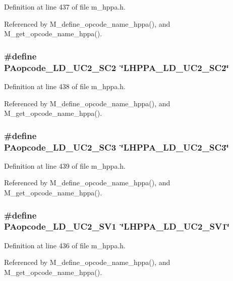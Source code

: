 Definition at line 437 of file m\_\-hppa.h.

Referenced by M\_\-define\_\-opcode\_\-name\_\-hppa(), and M\_\-get\_\-opcode\_\-name\_\-hppa().
\subsubsection{\setlength{\rightskip}{0pt plus 5cm}\#define PAopcode\_\-LD\_\-UC2\_\-SC2~\char`\"{}LHPPA\_\-LD\_\-UC2\_\-SC2\char`\"{}}\label{m__hppa_8h_3603bca4075fafcb8d890057ea895f97}




Definition at line 438 of file m\_\-hppa.h.

Referenced by M\_\-define\_\-opcode\_\-name\_\-hppa(), and M\_\-get\_\-opcode\_\-name\_\-hppa().
\subsubsection{\setlength{\rightskip}{0pt plus 5cm}\#define PAopcode\_\-LD\_\-UC2\_\-SC3~\char`\"{}LHPPA\_\-LD\_\-UC2\_\-SC3\char`\"{}}\label{m__hppa_8h_6f5702281c59bb8cb0df1ecd3f9c872c}




Definition at line 439 of file m\_\-hppa.h.

Referenced by M\_\-define\_\-opcode\_\-name\_\-hppa(), and M\_\-get\_\-opcode\_\-name\_\-hppa().
\subsubsection{\setlength{\rightskip}{0pt plus 5cm}\#define PAopcode\_\-LD\_\-UC2\_\-SV1~\char`\"{}LHPPA\_\-LD\_\-UC2\_\-SV1\char`\"{}}\label{m__hppa_8h_755caca35410029eec78701f098c1fdc}




Definition at line 436 of file m\_\-hppa.h.

Referenced by M\_\-define\_\-opcode\_\-name\_\-hppa(), and M\_\-get\_\-opcode\_\-name\_\-hppa().
